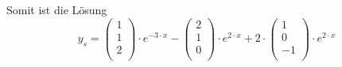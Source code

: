 \documentclass{scrreprt}
\begin{document}
\begin{enumerate}[(a)]
  Somit ist die Lösung
  \[
    y_s = \begin{pmatrix}
      1 \\
      1 \\
      2 \\
    \end{pmatrix} \cdot  e^{-3 \cdot x} - \begin{pmatrix}
      2 \\
      1 \\
      0 \\
    \end{pmatrix} \cdot e^{2 \cdot x} + 2 \cdot \begin{pmatrix}
      1  \\
      0  \\
      -1 \\
    \end{pmatrix} \cdot e^{2 \cdot x}
  \]
\end{enumerate}
\end{document}
